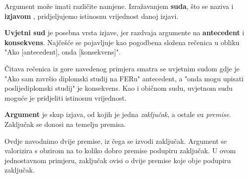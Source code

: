 Argument može imati različite namjene. Izražavanjem \textbf{suda}, što se naziva i \textbf{izjavom} , pridjeljujemo istinosnu vrijednost danoj izjavi. 
\vspace{2 mm}


\vspace{2 mm}
\textbf{Uvjetni sud}  je posebna vrsta izjave, jer razdvaja argumente na \textbf{antecedent} i \textbf{konsekvens}. Najčešće se pojavljuje kao pogodbena složena rečenica u obliku "Ako [antecedent], onda [konsekvens]".
\vspace{2 mm}


\vspace{2 mm}
Čitava rečenica iz gore navedenog primjera smatra se uvjetnim sudom gdje je "Ako sam završio diplomski studij na FERu" antecedent, a "onda mogu upisati poslijediplomski studij" je konsekvens. Kao i običnom sudu, uvjetnom sudu moguće je pridjeliti istinosnu vrijednost. 

\textbf{Argument} je skup izjava, od kojih je jedna \emph{zaključak}, a ostale su \emph{premise}. Zaključak se donosi na temelju premisa.
\vspace{2 mm}

\vspace{2 mm}

Ovdje navodnimo dvije premise, iz čega se izvodi zaključak. Argument se valorizira s obzirom na to koliko dobro premise podupiru zaključak. U ovom jednostavnom primjeru, zaključak ovisi o dvije premise koje obje podupiru zaključak. 

